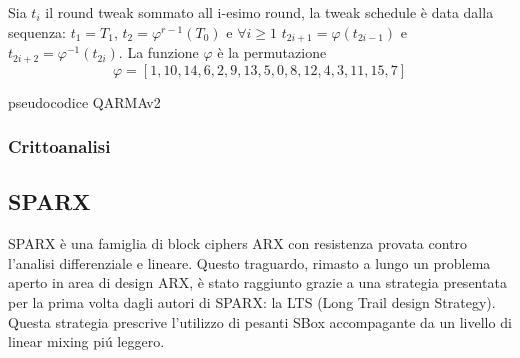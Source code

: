 \documentclass[target=bach,aauheader=,style=]{thud}
\begin{document}
			Sia $t_i$ il round tweak sommato all i-esimo round, la tweak schedule è data dalla sequenza: $t_1 = T_1$, $t_2 = \varphi^{r-1}(T_0)$ e $\forall i \ge 1$ $t_{2i+1} = \varphi (t_{2i-1})$ e $t_{2i+2} = \varphi^{-1} (t_{2i})$. La funzione $\varphi$ è la permutazione
			\[\varphi = [1,10,14,6,2,9,13,5,0,8,12,4,3,11,15,7]\]
			
			\begin{algorithm}
				\caption{pseudocodice QARMAv2}
				\begin{algorithmic}
						\Else
						\EndIf
					\EndFor
						\Else
						\EndIf
					\EndFor
					\EndProcedure
				\end{algorithmic}
			\end{algorithm}
			\subsubsection{Crittoanalisi}
		\subsection{SPARX}
		SPARX è una famiglia di block ciphers ARX con resistenza provata contro l'analisi differenziale e lineare. Questo traguardo, rimasto a lungo un problema aperto in area di design ARX, è stato raggiunto grazie a una strategia presentata per la prima volta dagli autori di SPARX: la LTS\cite{sparx} (Long Trail design Strategy). Questa strategia prescrive l'utilizzo di pesanti SBox accompagante da un livello di linear mixing piú leggero.
		
\end{document}
